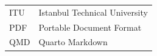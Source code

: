 \begin{tabular}{ll}
ITU & Istanbul Technical University\\
PDF & Portable Document Format\\
QMD & Quarto Markdown\\
\end{tabular}
